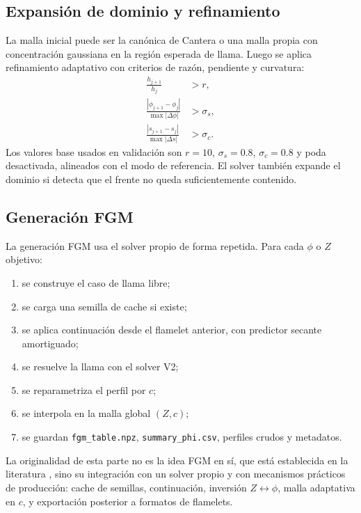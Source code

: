 \documentclass[12pt,a4paper]{article}
\begin{document}
\subsection{Expansión de dominio y refinamiento}

La malla inicial puede ser la canónica de Cantera o una malla propia con concentración gaussiana en la región esperada de llama. Luego se aplica refinamiento adaptativo con criterios de razón, pendiente y curvatura:
\begin{align}
  \frac{h_{j+1}}{h_j} &> r,
  \label{eq:ratio}\\
  \frac{|\phi_{j+1}-\phi_j|}{\max |\Delta\phi|} &> \sigma_s,
  \label{eq:slope}\\
  \frac{|s_{j+1}-s_j|}{\max |\Delta s|} &> \sigma_c.
  \label{eq:curve}
\end{align}
Los valores base usados en validación son $r=10$, $\sigma_s=0.8$, $\sigma_c=0.8$ y poda desactivada, alineados con el modo de referencia. El solver también expande el dominio si detecta que el frente no queda suficientemente contenido.

\subsection{Generación FGM}

La generación FGM usa el solver propio de forma repetida. Para cada $\phi$ o $Z$ objetivo:

\begin{enumerate}
  \item se construye el caso de llama libre;
  \item se carga una semilla de cache si existe;
  \item se aplica continuación desde el flamelet anterior, con predictor secante amortiguado;
  \item se resuelve la llama con el solver V2;
  \item se reparametriza el perfil por $c$;
  \item se interpola en la malla global $(Z,c)$;
  \item se guardan \texttt{fgm\_table.npz}, \texttt{summary\_phi.csv}, perfiles crudos y metadatos.
\end{enumerate}

La originalidad de esta parte no es la idea FGM en sí, que está establecida en la literatura \cite{vanOijen2000}, sino su integración con un solver propio y con mecanismos prácticos de producción: cache de semillas, continuación, inversión $Z\leftrightarrow\phi$, malla adaptativa en $c$, y exportación posterior a formatos de flamelets.
\end{document}
